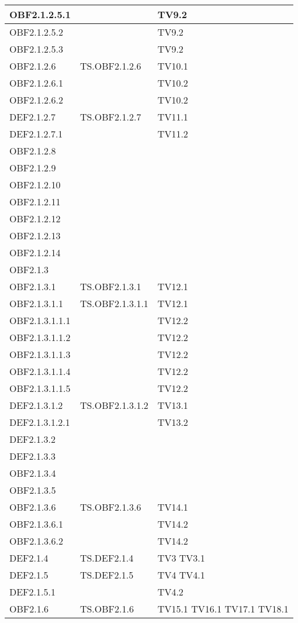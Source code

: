 \documentclass{scalatekids-article}
\begin{document}
\begin{longtable}[H]{|l|p{4cm}|p{4cm}|}
OBF2.1.2.5.1 & & TV9.2\\
\hline
OBF2.1.2.5.2 & & TV9.2\\
\hline
OBF2.1.2.5.3 & & TV9.2\\
\hline
OBF2.1.2.6 & TS.OBF2.1.2.6 & TV10.1\\
\hline
OBF2.1.2.6.1 & & TV10.2\\
\hline
OBF2.1.2.6.2 & & TV10.2\\
\hline
DEF2.1.2.7 & TS.OBF2.1.2.7 & TV11.1\\
\hline
DEF2.1.2.7.1 & & TV11.2\\
\hline
OBF2.1.2.8 &  &\\
\hline
OBF2.1.2.9 &  &\\
\hline
OBF2.1.2.10 &  &\\
\hline
OBF2.1.2.11 &  &\\
\hline
OBF2.1.2.12 &  &\\
\hline
OBF2.1.2.13 &  &\\
\hline
OBF2.1.2.14 &  &\\
\hline
OBF2.1.3 &  &\\
\hline
OBF2.1.3.1 & TS.OBF2.1.3.1 & TV12.1\\
\hline
OBF2.1.3.1.1 & TS.OBF2.1.3.1.1 & TV12.1\\
\hline
OBF2.1.3.1.1.1 & & TV12.2\\
\hline
OBF2.1.3.1.1.2 & & TV12.2\\
\hline
OBF2.1.3.1.1.3 & & TV12.2\\
\hline
OBF2.1.3.1.1.4 & & TV12.2\\
\hline
OBF2.1.3.1.1.5 & & TV12.2\\
\hline
DEF2.1.3.1.2 & TS.OBF2.1.3.1.2 & TV13.1\\
\hline
DEF2.1.3.1.2.1 & & TV13.2\\
\hline
DEF2.1.3.2 & &\\ %
\hline
DEF2.1.3.3 & &\\ %
\hline
OBF2.1.3.4 & &\\ %
\hline
OBF2.1.3.5 & &\\ %
\hline
OBF2.1.3.6 & TS.OBF2.1.3.6 & TV14.1\\
\hline
OBF2.1.3.6.1 & & TV14.2\\
\hline
OBF2.1.3.6.2 & & TV14.2\\
\hline
DEF2.1.4 & TS.DEF2.1.4 & TV3 TV3.1\\
\hline
DEF2.1.5 & TS.DEF2.1.5 & TV4 TV4.1\\
\hline
DEF2.1.5.1 & & TV4.2\\
\hline
OBF2.1.6 & TS.OBF2.1.6 & TV15.1 TV16.1 TV17.1 TV18.1\\

\end{longtable}
\end{document}
